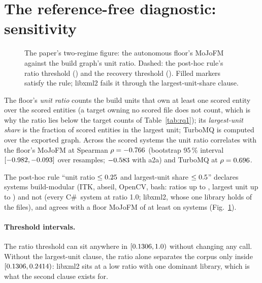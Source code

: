 \documentclass[10pt,conference]{IEEEtran}
\begin{document}
\section{The reference-free diagnostic: sensitivity}
\label{sec:tr-diagnostic}

\begin{figure}[t]
  \centering
  \resizebox{\columnwidth}{!}{}
  \caption{The paper's two-regime figure: the autonomous floor's MoJoFM against the build graph's
  unit ratio. Dashed: the post-hoc rule's ratio threshold (\rqAdequacyRatioMax{}) and the recovery
  threshold (\rqTwoRecoveredMin{}). Filled markers satisfy the rule; libxml2 fails it through the
  largest-unit-share clause.}
  \label{fig:regimes}
\end{figure}

The floor's \emph{unit ratio} counts the build units that own at least one scored entity over the
scored entities (a target owning no scored file does not count, which is why the ratio lies below
the target counts of Table~\ref{tab:rq1}); its \emph{largest-unit share} is the fraction of scored
entities in the largest unit; TurboMQ is computed over the exported graph. Across the
\rqAdequacyN{} scored systems the unit ratio correlates with the floor's MoJoFM at Spearman
$\rho=-0.766{}$ (bootstrap 95\,\% interval
$[-0.982{}, -0.093{}]$ over \rqAdequacyRhoBootReps{} resamples;
$-0.583{}$ with a2a) and TurboMQ at $\rho=0.696{}$.

The post-hoc rule ``unit ratio $\le0.25{}$ and largest-unit share
$\le0.5{}$'' declares \rqAdequacyAdequateCount{} systems build-modular (ITK,
abseil, OpenCV, bash: ratios up to \rqAdequacyCppRatioMax{}, largest unit up to
\rqAdequacyCppLargestMax{}) and \rqAdequacyInadequateCount{} not (every C\#\ system at ratio 1.0;
libxml2, whose one library holds \rqAdequacyLibxmlLargestShare{} of the files), and agrees with a
floor MoJoFM of at least \rqTwoRecoveredMin{} on \rqAdequacyRuleAgreement{} systems
(Fig.~\ref{fig:regimes}).

\paragraph{Threshold intervals.} The ratio threshold can sit anywhere in
$[0.1306{}, 1.0{})$ without changing any call. Without
the largest-unit clause, the ratio alone separates the corpus only inside
$[0.1306{}, 0.2414{})$: libxml2 sits at a low ratio
with one dominant library, which is what the second clause exists for.
\end{document}
